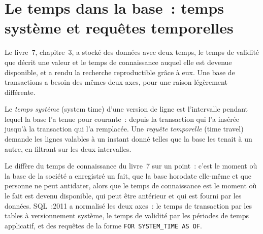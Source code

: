 \section{Le temps dans la base~: temps système et requêtes temporelles}

Le livre~7, chapitre~3, a stocké des données avec deux temps, le temps de validité que décrit une valeur et le temps de connaissance auquel elle est devenue disponible, et a rendu
la recherche reproductible grâce à eux. Une base de transactions a besoin des mêmes deux axes, pour une raison légèrement différente.

\begin{definition}\label{def:pl:databases-and-sql:system}
Le \emph{temps système} (system time) d'une version de ligne est l'intervalle pendant lequel la base l'a tenue pour courante~: depuis la
transaction qui l'a insérée jusqu'à la transaction qui l'a remplacée. Une \emph{requête temporelle} (time travel) demande les lignes
valables à un instant donné telles que la base les tenait à un autre, en filtrant sur les deux intervalles.
\end{definition}

Le  diffère du temps de connaissance du livre~7 sur un point~: c'est le moment où la base de la société a enregistré un fait, que la base horodate
elle-même et que personne ne peut antidater, alors que le temps de connaissance est le moment où le fait est devenu disponible, qui peut être antérieur et qui est fourni par les données.
SQL~:2011 a normalisé les deux axes~: le temps de transaction par les tables à versionnement système, le temps de validité par les périodes de temps applicatif, et des requêtes
de la forme \texttt{FOR SYSTEM\_TIME AS OF}.

\label{lst:pl:databases-and-sql:correct}

